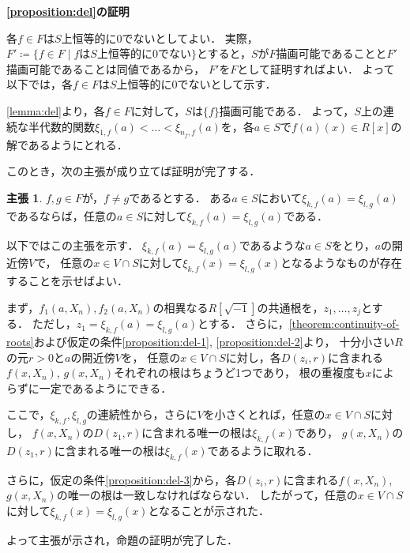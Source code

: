 \documentclass[uplatex, dvipdfmx]{jsarticle}
\makeatletter
\numberwithin{equation}{section}
\renewenvironment{proof}[1][\proofname]{\par
  \pushQED{\qed}%
  \normalfont \topsep6\p@\@plus6\p@\relax
  \trivlist
  \item\relax
  {\bfseries
  #1\@addpunct{.}}\hspace\labelsep\ignorespaces
}{
  \popQED\endtrivlist\@endpefalse
}
\theoremstyle{definition}
\newtheorem*{claim*}{主張}
\renewcommand{\proofname}{\textbf{証明}}
\makeatother
\begin{document}
\begin{proof}[{\bf \cref{proposition:del}の証明}]
     各$f \in F$は$S$上恒等的に$0$でないとしてよい．
     実際，$F' \coloneqq \{f \in F \mid \text{$f$は$S$上恒等的に$0$でない}\}$とすると，$S$が$F$描画可能であることと$F'$描画可能であることは同値であるから，
     $F'$を$F$として証明すればよい．
     よって以下では，各$f \in F$は$S$上恒等的に$0$でないとして示す．

     \cref{lemma:del}より，各$f \in F$に対して，$S$は$\{f\}$描画可能である．
     よって，$S$上の連続な半代数的関数$\xi_{1,f}(a) < \dots < \xi_{n_f, f}(a)$を，各$a \in S$で$f(a)(x) \in R[x]$の解であるようにとれる．

     このとき，次の主張が成り立てば証明が完了する．

     \begin{claim*}
          $f, g \in F$が，$f \neq g$であるとする．
          ある$a \in S$において$\xi_{k,f}(a) = \xi_{l,g}(a)$であるならば，任意の$a \in S$に対して$\xi_{k,f}(a) = \xi_{l,g}(a)$である．
     \end{claim*}

     以下ではこの主張を示す．
     $\xi_{k,f}(a) = \xi_{l, g}(a)$であるような$a \in S$をとり，$a$の開近傍$V$で，
     任意の$x \in V \cap S$に対して$\xi_{k,f}(x) = \xi_{l,g}(x)$となるようなものが存在することを示せばよい．

     まず，$f_1(a, X_n), f_2(a, X_n)$の相異なる$R\left[\sqrt{-1}\right]$の共通根を，$z_1, \dots, z_j$とする．
     ただし，$z_1 = \xi_{k,f}(a)=\xi_{l,g}(a)$とする．
     さらに，\cref{theorem:continuity-of-roots}および仮定の条件\ref{proposition:del-1}, \ref{proposition:del-2}より，
     十分小さい$R$の元$r>0$と$a$の開近傍$V$を，
     任意の$x \in V \cap S$に対し，各$D(z_i, r)$に含まれる$f(x, X_n)$, $g(x, X_n)$それぞれの根はちょうど1つであり，
     根の重複度も$x$によらずに一定であるようにできる．

     ここで，$\xi_{k,f}, \xi_{l, g}$の連続性から，さらに$V$を小さくとれば，任意の$x \in V \cap S$に対し，
     $f(x, X_n)$の$D(z_1, r)$に含まれる唯一の根は$\xi_{k,f}(x)$であり，
     $g(x, X_n)$の$D(z_1, r)$に含まれる唯一の根は$\xi_{k,f}(x)$であるように取れる．

     さらに，仮定の条件\ref{proposition:del-3}から，各$D(z_i, r)$に含まれる$f(x, X_n)$, $g(x, X_n)$の唯一の根は一致しなければならない．
     したがって，任意の$x \in V \cap S$に対して$\xi_{k, f}(x) = \xi_{l, g}(x)$となることが示された．

     よって主張が示され，命題の証明が完了した．
\end{proof}
\end{document}
